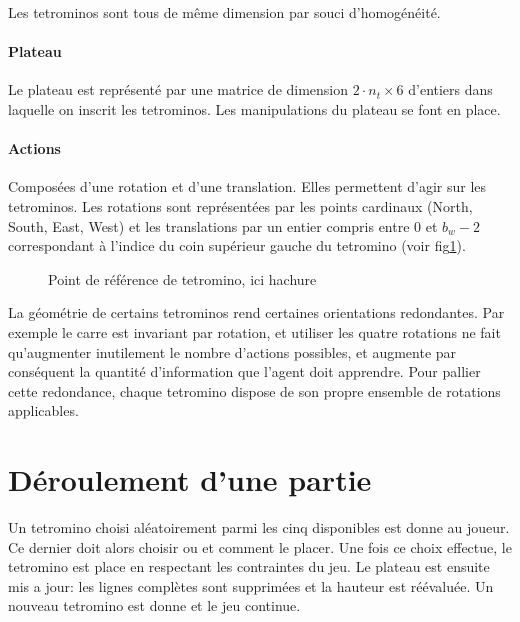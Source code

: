 \documentclass{report}
\begin{document}
Les tetrominos sont tous de même dimension par souci d'homogénéité.

\paragraph{Plateau}
Le plateau est représenté par une matrice de dimension
\(2\cdot n_t \times 6\) d'entiers dans laquelle on inscrit les tetrominos. Les
manipulations du plateau se font en place.


\paragraph{Actions}
Composées d'une rotation et d'une translation. Elles permettent d'agir sur les
tetrominos. Les rotations sont représentées par les points cardinaux
(North, South, East, West) et les translations par un entier compris entre 0 et
\(b_w - 2\) correspondant à l'indice du coin supérieur gauche du tetromino
(voir fig\ref{fig:tetref}).

\begin{figure}[h]
  \centering
  \qquad
  \caption{Point de référence de tetromino, ici hachure}\label{fig:tetref}
\end{figure}

La géométrie de certains tetrominos rend certaines orientations redondantes. Par
exemple le carre est invariant par rotation, et utiliser les quatre rotations
ne fait qu'augmenter inutilement le nombre d'actions possibles, et augmente par
conséquent la quantité d'information que l'agent doit apprendre. Pour pallier
cette redondance, chaque tetromino dispose de son propre ensemble de rotations
applicables.

\section{Déroulement d'une partie}
Un tetromino choisi aléatoirement parmi les cinq disponibles est donne au
joueur. Ce dernier doit alors choisir ou et comment le placer. Une fois ce
choix effectue, le tetromino est place en respectant les contraintes du jeu. Le
plateau est ensuite mis a jour: les lignes complètes sont supprimées et la
hauteur est réévaluée. Un nouveau tetromino est donne et le jeu continue.
\end{document}
